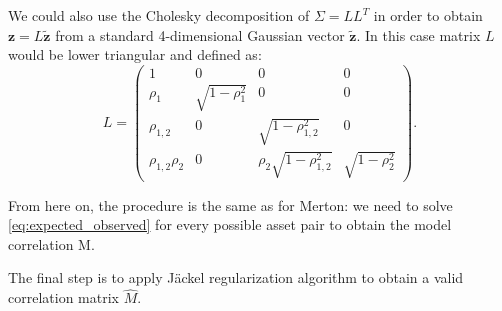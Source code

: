 We could also use the Cholesky decomposition of $\Sigma = L L^T$ in order to obtain $\mathbf{z} = L \mathbf{\tilde{z}}$ from a standard 4-dimensional Gaussian vector $\mathbf{\tilde{z}}$. In this case matrix $L$ would be lower triangular and defined as:
\begin{equation}
	L = \begin{pmatrix}
	1&0&0&0\\
	\rho_1 & \sqrt{1- \rho_1^2} &0&0\\
	\rho_{1,2} &0&\sqrt{1-\rho_{1,2}^2}&0\\
	\rho_{1,2}\rho_2 & 0& \rho_2 \sqrt{1-\rho_{1,2}^2}&\sqrt{1- \rho_2^2} 
	\end{pmatrix}.
\end{equation}

From here on, the procedure is the same as for Merton:
we need to solve \eqref{eq:expected_observed} for every possible asset pair to obtain the model correlation M.

The final step is to apply  J\"ackel regularization algorithm to obtain a valid correlation matrix $\widehat{M}$.

